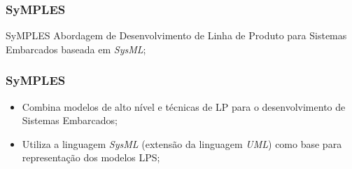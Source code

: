 \begin{frame}
\frametitle{SyMPLES}

\begin{block}{SyMPLES}
   Abordagem de Desenvolvimento de Linha de Produto para Sistemas Embarcados baseada em \textit{SysML};
\end{block}

\end{frame}


\begin{frame}
\frametitle{SyMPLES}

\begin{itemize}
 \item {
   Combina modelos de alto nível e técnicas de LP para o desenvolvimento de Sistemas Embarcados;
 }
 \item {
   Utiliza a linguagem \textit{SysML} (extensão da linguagem \textit{UML}) como base para representação dos modelos LPS;
 }
 
\end{itemize}

\end{frame}
